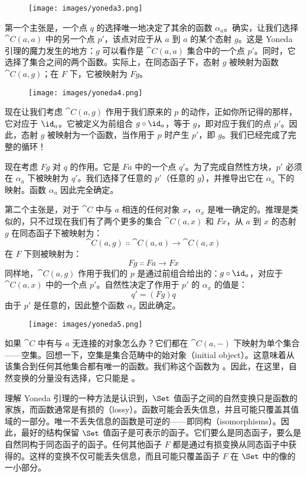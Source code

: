 \begin{figure}[H]
  \centering
  \texttt{[image: images/yoneda3.png]}
\end{figure}

\noindent
第一个主张是，一个点 $q$ 的选择唯一地决定了其余的函数 $\alpha_a$。确实，让我们选择 $\cat{C}(a, a)$ 中的另一个点 $p'$，该点对应于从 $a$ 到 $a$ 的某个态射 $g$。这是 Yoneda 引理的魔力发生的地方：$g$ 可以看作是 $\cat{C}(a, a)$ 集合中的一个点 $p'$。同时，它选择了集合之间的两个函数。实际上，在同态函子下，态射 $g$ 被映射为函数 $\cat{C}(a, g)$；在 $F$ 下，它被映射为 $F g$。

\begin{figure}[H]
  \centering
  \texttt{[image: images/yoneda4.png]}
\end{figure}

\noindent
现在让我们考虑 $\cat{C}(a, g)$ 作用于我们原来的 $p$ 的动作，正如你所记得的那样，它对应于 $\id_a$。它被定义为前组合 $g \circ \id_a$，等于 $g$，即对应于我们的点 $p'$。因此，态射 $g$ 被映射为一个函数，当作用于 $p$ 时产生 $p'$，即 $g$。我们已经完成了完整的循环！

现在考虑 $F g$ 对 $q$ 的作用。它是 $F a$ 中的一个点 $q'$。为了完成自然性方块，$p'$ 必须在 $\alpha_a$ 下被映射为 $q'$。我们选择了任意的 $p'$（任意的 $g$），并推导出它在 $\alpha_a$ 下的映射。函数 $\alpha_a$ 因此完全确定。

第二个主张是，对于 $\cat{C}$ 中与 $a$ 相连的任何对象 $x$，$\alpha_x$ 是唯一确定的。推理是类似的，只不过现在我们有了两个更多的集合 $\cat{C}(a, x)$ 和 $F x$，从 $a$ 到 $x$ 的态射 $g$ 在同态函子下被映射为：
\[\cat{C}(a, g) \Colon \cat{C}(a, a) \to \cat{C}(a, x)\]
在 $F$ 下则被映射为：
\[F g \Colon F a \to F x\]
同样地，$\cat{C}(a, g)$ 作用于我们的 $p$ 是通过前组合给出的：$g \circ \id_a$，对应于 $\cat{C}(a, x)$ 中的一个点 $p'$。自然性决定了作用于 $p'$ 的 $\alpha_x$ 的值是：
\[q' = (F g) q\]
由于 $p'$ 是任意的，因此整个函数 $\alpha_x$ 因此确定。

\begin{figure}[H]
  \centering
  \texttt{[image: images/yoneda5.png]}
\end{figure}

\noindent
如果 $\cat{C}$ 中有与 $a$ 无连接的对象怎么办？它们都在 $\cat{C}(a, -)$ 下映射为单个集合——空集。回想一下，空集是集合范畴中的始对象（initial object）。这意味着从该集合到任何其他集合都有唯一的函数。我们称这个函数为 。因此，在这里，自然变换的分量没有选择，它只能是 。

理解 Yoneda 引理的一种方法是认识到，$\Set$ 值函子之间的自然变换只是函数的家族，而函数通常是有损的（lossy）。函数可能会丢失信息，并且可能只覆盖其值域的一部分。唯一不丢失信息的函数是可逆的——即同构（isomorphisms）。因此，最好的结构保留 $\Set$ 值函子是可表示的函子。它们要么是同态函子，要么是自然同构于同态函子的函子。任何其他函子 $F$ 都是通过有损变换从同态函子中获得的。这样的变换不仅可能丢失信息，而且可能只覆盖函子 $F$ 在 $\Set$ 中的像的一小部分。

